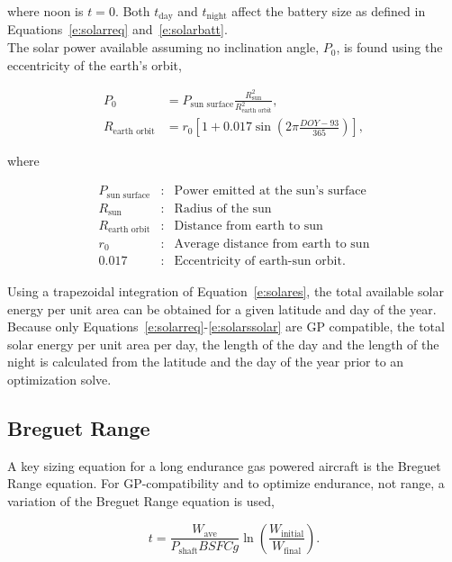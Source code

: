\documentclass[]{aiaa-tc}%
\begin{document}
    where noon is $t=0$. Both $t_{\text{day}}$ and $t_{\text{night}}$ affect the battery size as defined in Equations~\ref{e:solarreq} and~\ref{e:solarbatt}. \\

    The solar power available assuming no inclination angle, $P_0$, is found using the eccentricity of the earth's orbit, 

    \begin{align}
        \label{e:solarp0}
        P_0 & = P_{\text{sun surface}} \frac{R_{\text{sun}}^2}{R_{\text{earth orbit}}^2}, \\
        \label{e:solareo}
        R_{\text{earth orbit}} & = r_0 \left[ 1 + 0.017 \sin{\left( 2\pi \frac{DOY-93}{365}\right)} \right],
    \end{align}
    
    where 

    \[ \begin{array}{lcl}
        P_{\text{sun surface}} & : & \text{Power emitted at the sun's surface} \\
        R_{\text{sun}} & : & \text{Radius of the sun} \\
        R_{\text{earth orbit}} & : & \text{Distance from earth to sun} \\
        r_0 & : & \text{Average distance from earth to sun} \\
        0.017 & : & \text{Eccentricity of earth-sun orbit}.
    \end{array} \]

    Using a trapezoidal integration of Equation~\ref{e:solares}, the total available solar energy per unit area can be obtained for a given latitude and day of the year. Because only Equations~\ref{e:solarreq}-\ref{e:solarssolar} are GP compatible, the total solar energy per unit area per day, the length of the day and the length of the night is calculated from the latitude and the day of the year prior to an optimization solve.

\subsection{Breguet Range}

A key sizing equation for a long endurance gas powered aircraft is the Breguet Range equation.  
For GP-compatibility and to optimize endurance, not range, a variation of the Breguet Range equation is used, 

\begin{equation}
    \label{e:breguetendurance}
    t = \frac{W_{\text{ave}}}{P_{\text{shaft}}BSFCg} \ln{\left( \frac{W_{\text{initial}}}{W_{\text{final}}}\right)}.
\end{equation}
\end{document}
